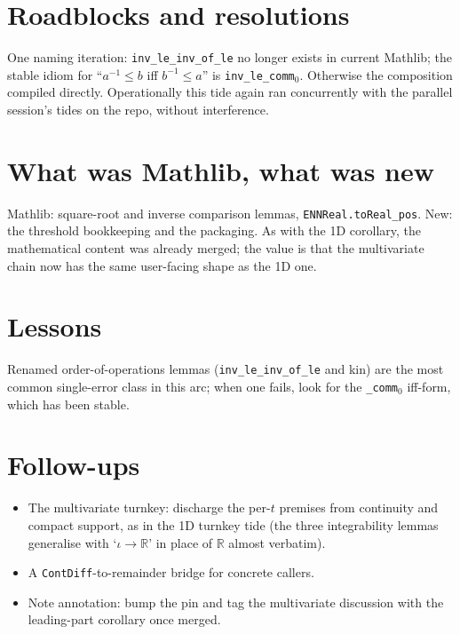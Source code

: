 \documentclass[11pt]{article}
\begin{document}
\section{Roadblocks and resolutions}

One naming iteration: \texttt{inv\_le\_inv\_of\_le} no longer exists in
current Mathlib; the stable idiom for ``$a^{-1} \leq b$ iff $b^{-1} \leq a$''
is \texttt{inv\_le\_comm}$_0$. Otherwise the composition compiled
directly.
Operationally this tide again ran concurrently with the parallel session's
tides on the repo, without interference.

\section{What was Mathlib, what was new}

Mathlib: square-root and inverse comparison lemmas,
\texttt{ENNReal.toReal\_pos}. New: the threshold bookkeeping and the
packaging. As with the 1D corollary, the mathematical content was already
merged; the value is that the multivariate chain now has the same
user-facing shape as the 1D one.

\section{Lessons}

Renamed order-of-operations lemmas (\texttt{inv\_le\_inv\_of\_le} and kin)
are the most common single-error class in this arc; when one fails, look
for the \texttt{\_comm}$_0$ iff-form, which has been stable.

\section{Follow-ups}

\begin{itemize}
\item The multivariate turnkey: discharge the per-$t$ premises from
continuity and compact support, as in the 1D turnkey tide (the three
integrability lemmas generalise with `$\iota \to \mathbb{R}$' in place of
$\mathbb{R}$ almost verbatim).
\item A \texttt{ContDiff}-to-remainder bridge for concrete callers.
\item Note annotation: bump the pin and tag the multivariate discussion
with the leading-part corollary once merged.
\end{itemize}
\end{document}
